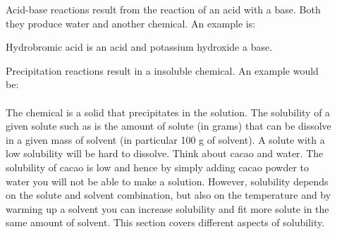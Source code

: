 \documentclass[main.tex]{subfiles}
\begin{document}
\begin{description}

\item[] Acid-base reactions result from the reaction of an acid with a base. Both they produce water and another chemical. An example is:
\begin{center}\end{center}
Hydrobromic acid  is an acid and potassium hydroxide a base.

\item[] Precipitation reactions result in a insoluble chemical. An example would be:\\
\\
The chemical  is a solid that precipitates in the solution.
The solubility of a given solute such as  is the amount of solute (in grams) that can be dissolve in a given mass of solvent (in particular 100 g of solvent). A solute with a low solubility will be hard to dissolve. Think about cacao and water. The solubility of cacao is low and hence by simply adding cacao powder to water you will not be able to make a solution. However, solubility depends on the solute and solvent combination, but also on the temperature and by warming up a solvent you can increase solubility and fit more solute in the same amount of solvent. This section covers different aspects of solubility.


\end{description}
\end{document}
